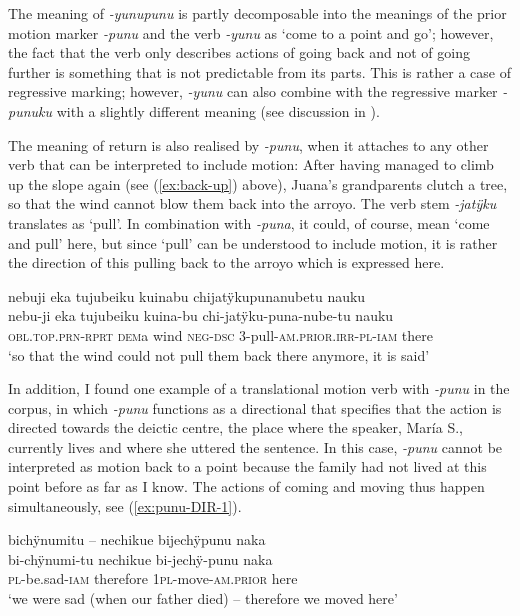 The meaning of \textit{-yunupunu} is partly decomposable into the meanings of the prior motion marker \textit{-punu} and the verb \textit{-yunu} as ‘come to a point and go’; however, the fact that the verb only describes actions of going back and not of going further is something that is not predictable from its parts. This is rather a case of regressive marking; however, \textit{-yunu} can also combine with the regressive marker \textit{-punuku} with a slightly different meaning (see discussion in ).

The meaning of return is also realised by \textit{-punu}, when it attaches to any other verb that can be interpreted to include motion: After having managed to climb up the slope again (see (\ref{ex:back-up}) above), Juana’s grandparents clutch a tree, so that the wind cannot blow them back into the arroyo. The verb stem \textit{-jatÿku} translates as ‘pull’. In combination with \textit{-puna}, it could, of course, mean ‘come and pull’ here, but since ‘pull’ can be understood to include motion, it is rather the direction of this pulling back to the arroyo which is expressed here.

\ea\label{ex:punu-DIR-2}
\begingl 
\glpreamble nebuji eka tujubeiku kuinabu chijatÿkupunanubetu nauku\\
\gla nebu-ji eka tujubeiku kuina-bu chi-jatÿku-puna-nube-tu nauku\\ 
\textsc{obl.top.prn}-\textsc{rprt} \textsc{dem}a wind \textsc{neg}-\textsc{dsc} 3-pull-\textsc{am.prior.irr}-\textsc{pl}-\textsc{iam} there\\ 
\glft ‘so that the wind could not pull them back there anymore, it is said’\\ 
\endgl
\trailingcitation{[jxx-p151016l-2]}
\xe

In addition, I found one example of a translational motion verb with \textit{-punu} in the corpus, in which \textit{-punu} functions as a directional that specifies that the action is directed towards the deictic centre, the place where the speaker, María S., currently lives and where she uttered the sentence. In this case, \textit{-punu} cannot be interpreted as motion back to a point because the family had not lived at this point before as far as I know. The actions of coming and moving thus happen simultaneously, see (\ref{ex:punu-DIR-1}).

\ea\label{ex:punu-DIR-1}
\begingl 
\glpreamble bichÿnumitu – nechikue bijechÿpunu naka\\
\gla bi-chÿnumi-tu nechikue bi-jechÿ-punu naka\\ 
\textsc{pl}-be.sad-\textsc{iam} therefore 1\textsc{pl}-move-\textsc{am.prior} here\\ 
\glft ‘we were sad (when our father died) – therefore we moved here’\\ 
\endgl
\trailingcitation{[rxx-e120511l.170-171]}
\xe


